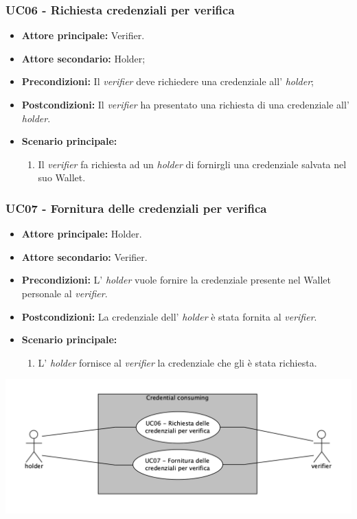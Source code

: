 \subsubsection{UC06 - Richiesta credenziali per verifica}
\begin{itemize}
\item \textbf{Attore principale:} Verifier.
\item \textbf{Attore secondario:} Holder; 
\item \textbf{Precondizioni:} Il \textit{verifier} deve richiedere una credenziale all' \textit{holder};
\item \textbf{Postcondizioni:} Il \textit{verifier} ha presentato una richiesta di una credenziale all' \textit{holder}.
\item \textbf{Scenario principale:} 
    \begin{enumerate}
        \item Il \textit{verifier} fa richiesta ad un \textit{holder} di fornirgli una credenziale salvata nel suo Wallet.
    \end{enumerate}
\end{itemize}

\subsubsection{UC07 - Fornitura delle credenziali per verifica}
\begin{itemize}
\item \textbf{Attore principale:} Holder. 
\item \textbf{Attore secondario:} Verifier.
\item \textbf{Precondizioni:} L’ \textit{holder} vuole fornire la credenziale presente nel Wallet personale al \textit{verifier}.
\item \textbf{Postcondizioni:} La credenziale dell’ \textit{holder} è stata fornita al \textit{verifier}.
\item \textbf{Scenario principale:} 
    \begin{enumerate}
        \item L' \textit{holder} fornisce al \textit{verifier} la credenziale che gli è stata richiesta.
    \end{enumerate}
\end{itemize}
\begin{center}
    \includegraphics[scale = 0.65]{./res/img/credentialConsuming.png}
\end{center}
